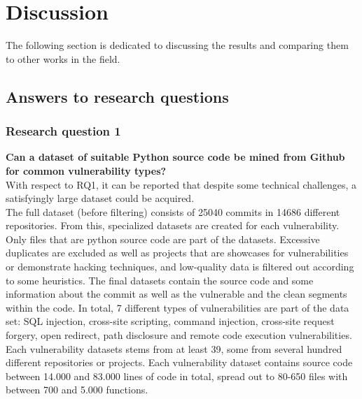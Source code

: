 \documentclass[
a4paper,
pagesize,
pdftex,
12pt,
ngerman,
fleqn,
final,
]{scrartcl}
\begin{document}
	\section{Discussion}\label{Discussion}
	The following section is dedicated to discussing the results and comparing them to other works in the field. 
	
	\subsection{Answers to research questions}
	
	\subsubsection{Research question 1}
	\textbf{Can a dataset of suitable Python source code be mined from Github for common vulnerability types?}\\
	With respect to RQ1, it can be reported that despite some technical challenges, a satisfyingly large dataset could be acquired.\\
	The full dataset (before filtering) consists of 25040 commits in 14686 different repositories. From this, specialized datasets are created for each vulnerability. Only files that are python source code are part of the datasets. Excessive duplicates are excluded as well as projects that are showcases for vulnerabilities or demonstrate hacking techniques, and low-quality data is filtered out according to some heuristics. The final datasets contain the source code and some information about the commit as well as the vulnerable and the clean segments within the code. In total, 7 different types of vulnerabilities are part of the data set: SQL injection, cross-site scripting, command injection, cross-site request forgery, open redirect, path disclosure and remote code execution vulnerabilities.\\
	Each vulnerability datasets stems from at least 39, some from several hundred different repositories or projects. Each vulnerability dataset contains source code between 14.000 and 83.000 lines of code in total, spread out to 80-650 files with between 700 and 5.000 functions.\\ 
	
\end{document}
